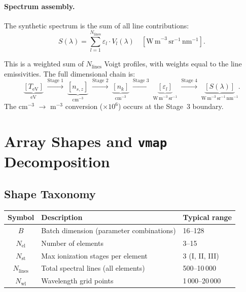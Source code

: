 \documentclass[11pt]{article}
\newcommand{\TeV}{T_\mathrm{eV}}
\begin{document}
\paragraph{Spectrum assembly.}
The synthetic spectrum is the sum of all line contributions:
\begin{equation}
  \label{eq:spectrum}
  \boxed{S(\lambda) = \sum_{l=1}^{N_\mathrm{lines}}
    \varepsilon_l \cdot V_l(\lambda)
  \quad [\mathrm{W\,m}^{-3}\,\mathrm{sr}^{-1}\,\mathrm{nm}^{-1}].}
\end{equation}

This is a weighted sum of $N_\mathrm{lines}$ Voigt profiles, with weights
equal to the line emissivities. The full dimensional chain is:
\begin{equation}
  \label{eq:dim-chain}
  \underbrace{[\TeV]}_\mathrm{eV}
  \;\xrightarrow{\text{Stage 1}}\;
  \underbrace{[n_{s,z}]}_\mathrm{cm^{-3}}
  \;\xrightarrow{\text{Stage 2}}\;
  \underbrace{[n_k]}_\mathrm{cm^{-3}}
  \;\xrightarrow{\text{Stage 3}}\;
  \underbrace{[\varepsilon_l]}_\mathrm{W\,m^{-3}\,sr^{-1}}
  \;\xrightarrow{\text{Stage 4}}\;
  \underbrace{[S(\lambda)]}_\mathrm{W\,m^{-3}\,sr^{-1}\,nm^{-1}}.
\end{equation}
The cm$^{-3}$ $\to$ m$^{-3}$ conversion ($\times 10^6$) occurs at the
Stage~3 boundary.


\section{Array Shapes and \texttt{vmap} Decomposition}
\label{sec:vmap}

\subsection{Shape Taxonomy}
\label{sec:shapes}

\begin{center}
\begin{tabular}{cll}
\toprule
\textbf{Symbol} & \textbf{Description} & \textbf{Typical range} \\
\midrule
$B$           & Batch dimension (parameter combinations)  & 16--128 \\
$N_\mathrm{el}$  & Number of elements                    & 3--15 \\
$N_\mathrm{st}$  & Max ionization stages per element     & 3 (I, II, III) \\
$N_\mathrm{lines}$ & Total spectral lines (all elements) & 500--10\,000 \\
$N_\mathrm{wl}$  & Wavelength grid points                & 1\,000--20\,000 \\
\bottomrule
\end{tabular}
\end{center}
\end{document}

